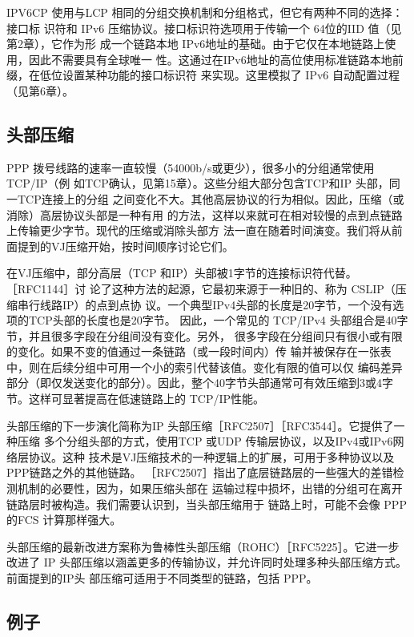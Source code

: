 IPV6CP 使用与LCP 相同的分组交换机制和分组格式，但它有两种不同的选择：接口标
识符和 IPv6 压缩协议。接口标识符选项用于传输一个 64位的IID 值（见第2章），它作为形
成一个链路本地 IPv6地址的基础。由于它仅在本地链路上使用，因此不需要具有全球唯一
性。这通过在IPv6地址的高位使用标准链路本地前缀，在低位设置某种功能的接口标识符
来实现。这里模拟了 IPv6 自动配置过程（见第6章）。

\subsection{头部压缩}

PPP 拨号线路的速率一直较慢（54000b/s或更少），很多小的分组通常使用TCP/IP（例
如TCP确认，见第15章）。这些分组大部分包含TCP和IP 头部，同一TCP连接上的分组
之间变化不大。其他高层协议的行为相似。因此，压缩（或消除）高层协议头部是一种有用
的方法，这样以来就可在相对较慢的点到点链路上传输更少字节。现代的压缩或消除头部方
法一直在随着时间演变。我们将从前面提到的VJ压缩开始，按时间顺序讨论它们。

在VJ压缩中，部分高层（TCP 和IP）头部被1字节的连接标识符代替。［RFC1144］讨
论了这种方法的起源，它最初来源于一种旧的、称为 CSLIP（压缩串行线路IP）的点到点协
议。一个典型IPv4头部的长度是20字节，一个没有选项的TCP头部的长度也是20字节。
因此，一个常见的 TCP/IPv4 头部组合是40字节，并且很多字段在分组间没有变化。另外，
很多字段在分组间只有很小或有限的变化。如果不变的值通过一条链路（或一段时间内）传
输并被保存在一张表中，则在后续分组中可用一个小的索引代替该值。变化有限的值可以仅
编码差异部分（即仅发送变化的部分）。因此，整个40字节头部通常可有效压缩到3或4字
节。这样可显著提高在低速链路上的 TCP/IP性能。

头部压缩的下一步演化简称为IP 头部压缩［RFC2507］［RFC3544］。它提供了一种压缩
多个分组头部的方式，使用TCP 或UDP 传输层协议，以及IPv4或IPv6网络层协议。这种
技术是VJ压缩技术的一种逻辑上的扩展，可用于多种协议以及PPP链路之外的其他链路。
［RFC2507］指出了底层链路层的一些强大的差错检测机制的必要性，因为，如果压缩头部在
运输过程中损坏，出错的分组可在离开链路层时被构造。我们需要认识到，当头部压缩用于
链路上时，可能不会像 PPP的FCS 计算那样强大。

头部压缩的最新改进方案称为鲁棒性头部压缩（ROHC）［RFC5225］。它进一步改进了
IP 头部压缩以涵盖更多的传输协议，并允许同时处理多种头部压缩方式。前面提到的IP头
部压缩可适用于不同类型的链路，包括 PPP。

\subsection{例子}

